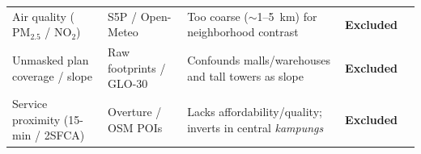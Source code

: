 \begin{table}[htbp]
\begin{tabularx}{\textwidth}{@{}>{\raggedright\arraybackslash}p{3.0cm}>{\raggedright\arraybackslash}p{2.3cm}>{\raggedright\arraybackslash}X l >{\raggedright\arraybackslash}p{2.8cm}@{}}
Air quality ($\text{PM}_{2.5}$ / $\text{NO}_2$) & S5P / Open-Meteo & Too coarse ($\sim$1--5~km) for neighborhood contrast & \textbf{Excluded} & \citet{vanDonkelaar2021} \\
Unmasked plan coverage / slope & Raw footprints / GLO-30 & Confounds malls/warehouses and tall towers as slope & \textbf{Excluded} & \citet{Chamberlain2024, Hawker2022} \\
Service proximity (15-min / 2SFCA) & Overture / OSM POIs & Lacks affordability/quality; inverts in central \textit{kampungs} & \textbf{Excluded} & \citet{Herfort2023, Hidayati2020} \\
\bottomrule
\end{tabularx}
\end{table}
